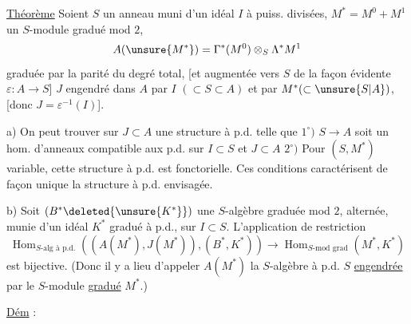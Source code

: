 \uline{Théorème} Soient $S$ un anneau muni d'un idéal $I$ à puiss. divisées, $M^*=M^0+M^1$ un $S$-module gradué mod $2$,
\[
A(\unsure{M^*})=\Gamma^*(M^0)\otimes_S\Lambda^*M^1
\]
 graduée par la parité du degré total, [et augmentée vers $S$ de la façon évidente $\varepsilon:A\longrightarrow S$] $J$  engendré dans $A$ par $I$ $(\subset S\subset A)$ et par $M^*(\subset\unsure{S|A})$, [donc $J=\varepsilon^{-1}(I)$].

a) On peut trouver sur  $J\subset A$ une structure à p.d. telle que $1^\circ)$ $S\longrightarrow A$ soit un hom. d'anneaux compatible aux p.d. sur $I\subset S$ et $J\subset A$ $2^\circ)$ Pour $(S,M^*)$ variable, cette structure à p.d. est fonctorielle. Ces conditions caractérisent de façon unique la structure à p.d. envisagée.

b) Soit $(B^*\deleted{\unsure{K^*}})$ une $S$-algèbre graduée mod $2$,  alternée, munie d'un idéal $K^*$ gradué à p.d.,   sur $I\subset S$.
L'application de restriction
\[
\operatorname{Hom}_{S\text{-alg à p.d.}}((A(M^*),J(M^*)),(B^*,K^*))
\longrightarrow\operatorname{Hom}_{S\text{-mod grad}}(M^*,K^*)
\]
est bijective. (Donc il y a lieu d'appeler $A(M^*)$ la $S$-algèbre  à p.d.  $S$ \uline{engendrée} par le $S$-module \uline{gradué} $M^*$.)

\uline{Dém} :
